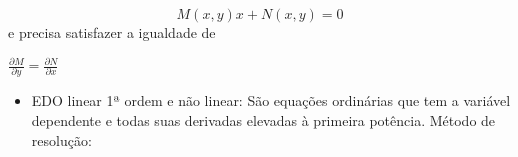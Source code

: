 \begin{equation}
M(x,y)x + N(x,y) = 0
\end{equation}
e precisa satisfazer a igualdade de

\begin{center}
$ \frac{\partial M}{\partial y} = \frac{\partial N}{\partial x} $
\end{center}



\begin{itemize}
\item{EDO linear 1ª ordem e não linear:} São equações ordinárias que tem a variável dependente e todas suas derivadas elevadas à primeira potência.
Método de resolução: 

\begin{comment}
  Exemplo de uma EDO linear 1ª ordem 

  a1(x)\frac{dy}{dx} + a0(x)y = g(x)
\end{comment}
\end{itemize}


